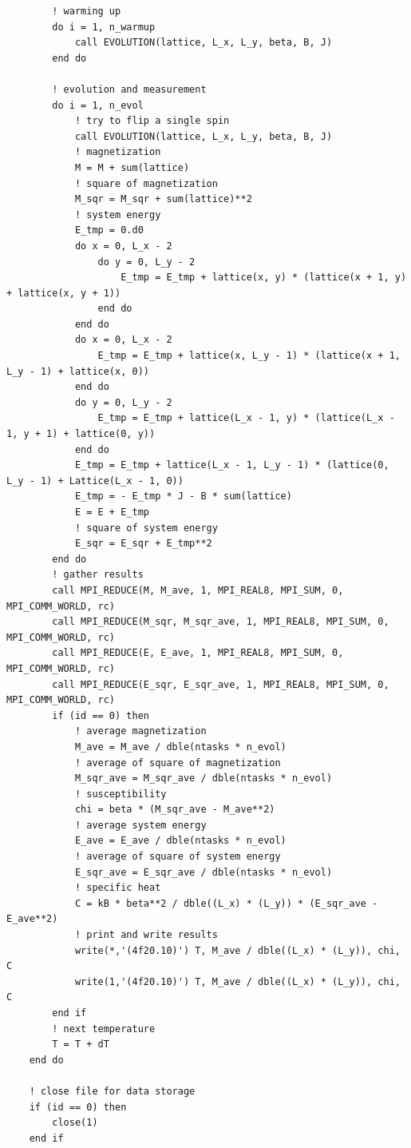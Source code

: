 \documentclass[UTF8,10pt,a4paper]{article}
\theoremstyle{Problem}
\theoremstyle{Solution}
\begin{document}
\begin{lstlisting}
        ! warming up
        do i = 1, n_warmup
            call EVOLUTION(lattice, L_x, L_y, beta, B, J)
        end do

        ! evolution and measurement
        do i = 1, n_evol
            ! try to flip a single spin
            call EVOLUTION(lattice, L_x, L_y, beta, B, J)
            ! magnetization
            M = M + sum(lattice)
            ! square of magnetization
            M_sqr = M_sqr + sum(lattice)**2
            ! system energy
            E_tmp = 0.d0
            do x = 0, L_x - 2
                do y = 0, L_y - 2
                    E_tmp = E_tmp + lattice(x, y) * (lattice(x + 1, y) + lattice(x, y + 1))
                end do
            end do
            do x = 0, L_x - 2
                E_tmp = E_tmp + lattice(x, L_y - 1) * (lattice(x + 1, L_y - 1) + lattice(x, 0))
            end do
            do y = 0, L_y - 2
                E_tmp = E_tmp + lattice(L_x - 1, y) * (lattice(L_x - 1, y + 1) + lattice(0, y))
            end do
            E_tmp = E_tmp + lattice(L_x - 1, L_y - 1) * (lattice(0, L_y - 1) + Lattice(L_x - 1, 0))
            E_tmp = - E_tmp * J - B * sum(lattice)
            E = E + E_tmp
            ! square of system energy
            E_sqr = E_sqr + E_tmp**2
        end do
        ! gather results
        call MPI_REDUCE(M, M_ave, 1, MPI_REAL8, MPI_SUM, 0, MPI_COMM_WORLD, rc)
        call MPI_REDUCE(M_sqr, M_sqr_ave, 1, MPI_REAL8, MPI_SUM, 0, MPI_COMM_WORLD, rc)
        call MPI_REDUCE(E, E_ave, 1, MPI_REAL8, MPI_SUM, 0, MPI_COMM_WORLD, rc)
        call MPI_REDUCE(E_sqr, E_sqr_ave, 1, MPI_REAL8, MPI_SUM, 0, MPI_COMM_WORLD, rc)
        if (id == 0) then
            ! average magnetization
            M_ave = M_ave / dble(ntasks * n_evol)
            ! average of square of magnetization
            M_sqr_ave = M_sqr_ave / dble(ntasks * n_evol)
            ! susceptibility
            chi = beta * (M_sqr_ave - M_ave**2)
            ! average system energy
            E_ave = E_ave / dble(ntasks * n_evol)
            ! average of square of system energy
            E_sqr_ave = E_sqr_ave / dble(ntasks * n_evol)
            ! specific heat
            C = kB * beta**2 / dble((L_x) * (L_y)) * (E_sqr_ave - E_ave**2)
            ! print and write results
            write(*,'(4f20.10)') T, M_ave / dble((L_x) * (L_y)), chi, C
            write(1,'(4f20.10)') T, M_ave / dble((L_x) * (L_y)), chi, C
        end if
        ! next temperature
        T = T + dT
    end do

    ! close file for data storage
    if (id == 0) then
        close(1)
    end if


\end{lstlisting}
\end{document}
